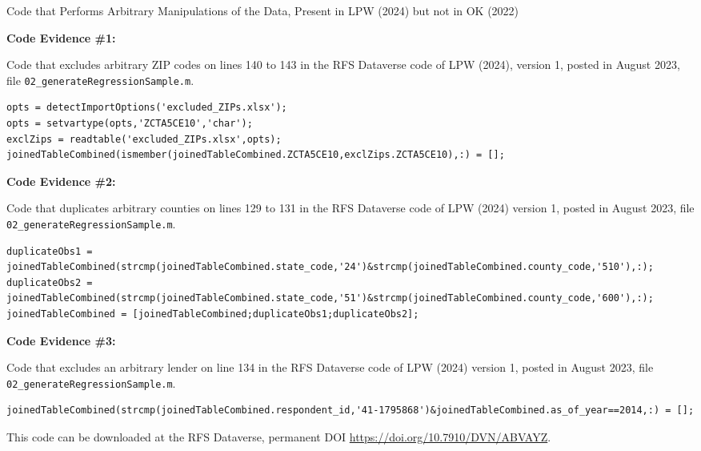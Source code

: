 \documentclass{article}
\begin{document}
\begin{table}

\caption{Code that Performs Arbitrary Manipulations of the Data, Present in LPW (2024) but not in OK (2022)}

\bigskip

\textbf{Code Evidence \#1:}

\bigskip

Code that excludes arbitrary ZIP codes on lines 140 to 143 in the RFS Dataverse code of LPW (2024), version 1,
posted in August 2023, file \texttt{02\_generateRegressionSample.m}.

{%
\begin{lstlisting}
opts = detectImportOptions('excluded_ZIPs.xlsx');                                      
opts = setvartype(opts,'ZCTA5CE10','char');                                            
exclZips = readtable('excluded_ZIPs.xlsx',opts);                                       
joinedTableCombined(ismember(joinedTableCombined.ZCTA5CE10,exclZips.ZCTA5CE10),:) = [];
\end{lstlisting}}

\bigskip

\textbf{Code Evidence \#2:}

\bigskip

Code that duplicates arbitrary counties on lines 129 to 131 in the RFS Dataverse code of LPW (2024) version 1,
posted in August 2023, file \texttt{02\_generateRegressionSample.m}.

{\footnotesize
\begin{lstlisting}
duplicateObs1 = joinedTableCombined(strcmp(joinedTableCombined.state_code,'24')&strcmp(joinedTableCombined.county_code,'510'),:);
duplicateObs2 = joinedTableCombined(strcmp(joinedTableCombined.state_code,'51')&strcmp(joinedTableCombined.county_code,'600'),:);
joinedTableCombined = [joinedTableCombined;duplicateObs1;duplicateObs2];
\end{lstlisting}}

\bigskip

\textbf{Code Evidence \#3:}

\bigskip

Code that excludes an arbitrary lender on line 134 in the RFS Dataverse code of LPW (2024) version 1,
posted in August 2023, file \texttt{02\_generateRegressionSample.m}.

{\footnotesize
\begin{lstlisting}
joinedTableCombined(strcmp(joinedTableCombined.respondent_id,'41-1795868')&joinedTableCombined.as_of_year==2014,:) = [];
\end{lstlisting}}

\bigskip

This code can be downloaded at the RFS Dataverse, permanent DOI \url{https://doi.org/10.7910/DVN/ABVAYZ}.

\end{table}
\end{document}
